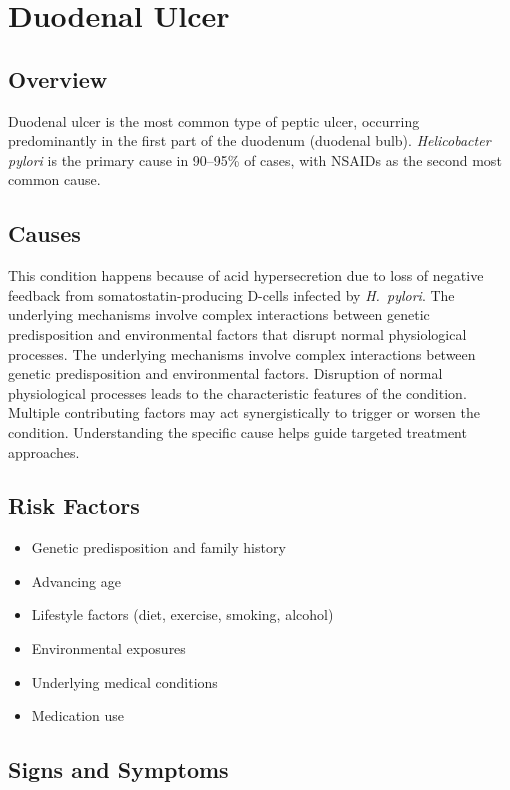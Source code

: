 \chapter{Duodenal Ulcer}
\label{sec:Duodenal Ulcer}

\section{Overview}
Duodenal ulcer is the most common type of peptic ulcer, occurring predominantly in the first part of the duodenum (duodenal bulb). \textit{Helicobacter pylori} is the primary cause in 90--95\% of cases, with NSAIDs as the second most common cause.
\section{Causes}
This condition happens because of acid hypersecretion due to loss of negative feedback from somatostatin-producing D-cells infected by \textit{H.~pylori}. The underlying mechanisms involve complex interactions between genetic predisposition and environmental factors that disrupt normal physiological processes. The underlying mechanisms involve complex interactions between genetic predisposition and environmental factors. Disruption of normal physiological processes leads to the characteristic features of the condition. Multiple contributing factors may act synergistically to trigger or worsen the condition. Understanding the specific cause helps guide targeted treatment approaches.
\section{Risk Factors}


\begin{itemize}[noitemsep]
  \item Genetic predisposition and family history
  \item Advancing age
  \item Lifestyle factors (diet, exercise, smoking, alcohol)
  \item Environmental exposures
  \item Underlying medical conditions
  \item Medication use
\end{itemize}
\section{Signs and Symptoms}

